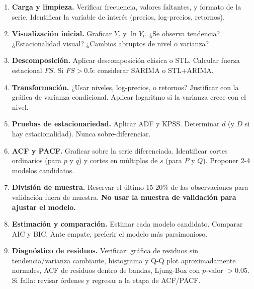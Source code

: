 \documentclass[12pt,a4paper]{article}
\theoremstyle{definition}
\begin{document}
\begin{defbox}
\begin{enumerate}
  \item[$\square$] \textbf{Carga y limpieza.}
    Verificar frecuencia, valores faltantes, y formato de la serie.
    Identificar la variable de interés (precios, log-precios, retornos).

  \item[$\square$] \textbf{Visualización inicial.}
    Graficar $Y_t$ y $\ln Y_t$. ¿Se observa tendencia? ¿Estacionalidad visual?
    ¿Cambios abruptos de nivel o varianza?

  \item[$\square$] \textbf{Descomposición.}
    Aplicar descomposición clásica o STL. Calcular fuerza estacional $FS$.
    Si $FS > 0.5$: considerar SARIMA o STL+ARIMA.

  \item[$\square$] \textbf{Transformación.}
    ¿Usar niveles, log-precios, o retornos? Justificar con la gráfica de
    varianza condicional. Aplicar logaritmo si la varianza crece con el nivel.

  \item[$\square$] \textbf{Pruebas de estacionariedad.}
    Aplicar ADF y KPSS. Determinar $d$ (y $D$ si hay estacionalidad).
    Nunca sobre-diferenciar.

  \item[$\square$] \textbf{ACF y PACF.}
    Graficar sobre la serie diferenciada. Identificar cortes ordinarios (para
    $p$ y $q$) y cortes en múltiplos de $s$ (para $P$ y $Q$).
    Proponer 2-4 modelos candidatos.

  \item[$\square$] \textbf{División de muestra.}
    Reservar el último 15-20\% de las observaciones para validación fuera de
    muestra. \textbf{No usar la muestra de validación para ajustar el modelo.}

  \item[$\square$] \textbf{Estimación y comparación.}
    Estimar cada modelo candidato. Comparar AIC y BIC. Ante empate, preferir
    el modelo más parsimonioso.

  \item[$\square$] \textbf{Diagnóstico de residuos.}
    Verificar: gráfica de residuos sin tendencia/varianza cambiante,
    histograma y Q-Q plot aproximadamente normales, ACF de residuos dentro
    de bandas, Ljung-Box con $p$-valor $> 0.05$.
    Si falla: revisar órdenes y regresar a la etapa de ACF/PACF.


\end{enumerate}
\end{defbox}
\end{document}
